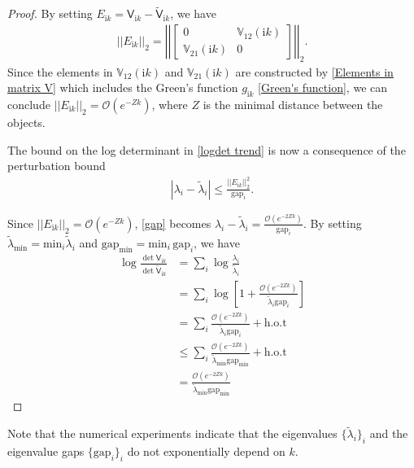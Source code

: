 \begin{proof}
    By setting $E_{\mathrm{i}k} = \mathsf{V}_{\mathrm{i}k} - \tilde{\mathsf{V}}_{\mathrm{i}k}$, we have 
    \begin{align*}
        ||E_{\mathrm{i}k}||_{2} = \left|\left|\begin{bmatrix}
            0 & \mathbb{V}_{12}(\mathrm{i}k)\\
            \mathbb{V}_{21}(\mathrm{i}k) & 0
        \end{bmatrix}\right|\right|_{2}.
    \end{align*}
    Since the elements in $\mathbb{V}_{12}(\mathrm{i}k)$ and $\mathbb{V}_{21}(\mathrm{i}k)$ are constructed by \eqref{Elements in matrix V} which includes the 
    Green's function $g_{\mathrm{i}k}$ \eqref{Green's function}, we can conclude $||E_{\mathrm{i}k}||_{2} = \mathcal{O}(e^{-Zk})$, where
    $Z$ is the minimal distance between the objects. 

    The bound on the log determinant in  \eqref{logdet trend} is now a consequence of the perturbation bound \cite{MathiasRoy1998QRBf}
    \begin{align}\label{gap}
        |\lambda_{i} - \tilde{\lambda}_{i}| \leq \frac{||E_{\mathrm{i}k}||_{2}^{2}}{\text{gap}_{i}}.
    \end{align}


    Since  $||E_{\mathrm{i}k}||_{2} = \mathcal{O}(e^{-Zk})$, \eqref{gap} becomes $\lambda_{i} - \tilde{\lambda}_{i} = \frac{\mathcal{O}(e^{-2Zk})}{\text{gap}_{i}}$.
    By setting $\tilde{\lambda}_{\text{min}} = \text{min}_{i}\tilde{\lambda}_{i}$ and $\text{gap}_{\text{min}} = \text{min}_{i}\,\text{gap}_{i}$, we have 
    \begin{align*}
        \log\frac{\det\mathsf{V}_{\mathrm{i}k}}{\det\tilde{\mathsf{V}}_{\mathrm{i}k}} &= \sum_{i}\log\frac{\lambda_{i}}{\tilde{\lambda}_{i}}\\
        &= \sum_{i}\log\left[1+\frac{\mathcal{O}(e^{-2Zk})}{\tilde{\lambda}_{i}\text{gap}_{i}}\right]\\
        &= \sum_{i} \frac{\mathcal{O}(e^{-2Zk})}{\tilde{\lambda}_{i}\text{gap}_{i}} + \text{h.o.t}\\
        &\leq \sum_{i}\frac{\mathcal{O}(e^{-2Zk})}{\tilde{\lambda}_{\text{min}}\text{gap}_{\text{min}}} + \text{h.o.t}\\
        &= \frac{\mathcal{O}(e^{-2Zk})}{\tilde{\lambda}_{\text{min}}\text{gap}_{\text{min}}} 
    \end{align*}
\end{proof}
Note that the numerical experiments indicate that the eigenvalues $\{\tilde{\lambda}_{i}\}_{i}$ and the eigenvalue gaps $\{\text{gap}_{i}\}_{i}$ do not exponentially
depend on $k$.


